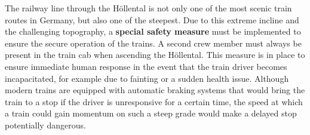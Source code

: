 \documentclass[landscape, a4paper]{article}
\newcommand\alert[1]{\textcolor{PrimaryColor}{\textbf{#1}}}
\begin{document}
\begin{minipage}[t]{0.31\textwidth}
{    The railway line through the Höllental is not only one of the most scenic train routes in Germany, but also one of the steepest. Due to this extreme incline and the challenging topography, a \alert{special safety measure} must be implemented to ensure the secure operation of the trains. A second crew member must always be present in the train cab when ascending the Höllental. This measure is in place to ensure immediate human response in the event that the train driver becomes incapacitated, for example due to fainting or a sudden health issue. Although modern trains are equipped with automatic braking systems that would bring the train to a stop if the driver is unresponsive for a certain time, the speed at which a train could gain momentum on such a steep grade would make a delayed stop potentially dangerous. %

	}{
	}
\end{minipage}%
\hfill%
\vrule width 0.01cm
\hfill%
\end{document}
